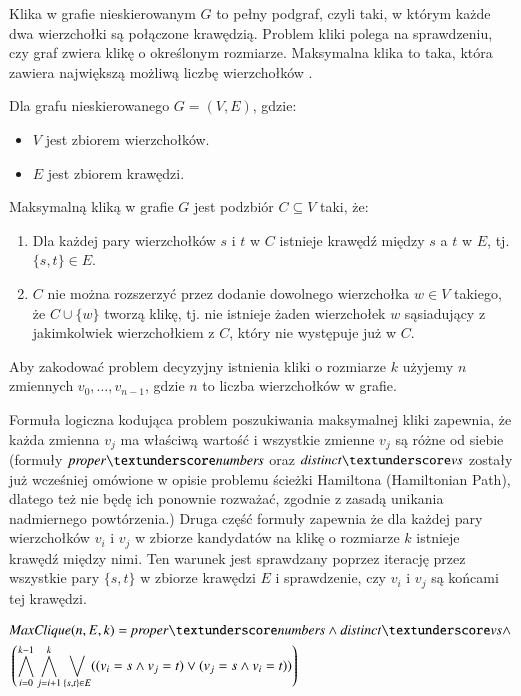 Klika w grafie nieskierowanym \(G\) to pełny podgraf, czyli taki, w którym każde dwa wierzchołki są połączone krawędzią. Problem kliki polega na sprawdzeniu, czy graf zwiera klikę o określonym rozmiarze. Maksymalna klika to taka, która zawiera największą możliwą liczbę wierzchołków \cite{Sipser0086373}. 

Dla grafu nieskierowanego $G = (V, E)$, gdzie:
\begin{itemize}
 	\item \(V\) jest zbiorem wierzchołków.
 	\item \(E\) jest zbiorem krawędzi.
\end{itemize}
Maksymalną kliką w grafie \(G\) jest podzbiór $C \subseteq V$ taki, że:
\begin{enumerate}
 	\item Dla każdej pary wierzchołków \(s\) i \(t\) w \(C\) istnieje krawędź między \(s\) a \(t\) w \(E\), tj. $\{s, t\}\in E$. 
 	\item \(C\) nie można rozszerzyć przez dodanie dowolnego wierzchołka $w\in V$ takiego, że $C \cup \{w\}$ tworzą klikę, tj. nie istnieje żaden wierzchołek \(w\) sąsiadujący z jakimkolwiek wierzchołkiem z \(C\), który nie występuje już w \(C\).
\end{enumerate}

Aby zakodować problem decyzyjny istnienia kliki o rozmiarze $k$ użyjemy $n$ zmiennych $v_0,\ldots,v_{n-1}$, gdzie $n$ to liczba wierzchołków w grafie.

Formuła logiczna kodująca problem poszukiwania maksymalnej kliki zapewnia, że każda zmienna \(v_j\) ma właściwą wartość i wszystkie zmienne \(v_j\) są różne od siebie (formuły $\propernumbers$ oraz $\distinctvs$ zostały już wcześniej omówione w opisie problemu ścieżki Hamiltona (Hamiltonian Path), dlatego też nie będę ich ponownie rozważać, zgodnie z zasadą unikania nadmiernego powtórzenia.) Druga część formuły zapewnia że dla każdej pary wierzchołków \(v_i\) i \(v_j\) w zbiorze kandydatów na klikę o rozmiarze \(k\) istnieje krawędź między nimi. Ten warunek jest sprawdzany poprzez iterację przez wszystkie pary $\{s,t\}$ w zbiorze krawędzi \(E\) i sprawdzenie, czy \(v_i\) i \(v_j\) są końcami tej krawędzi.

\begin{align*}
	&\MaxClique(n, E, k) = \propernumbers  \land \distinctvs  \land \\
	&\left( \bigwedge_{i=0}^{k-1} \bigwedge_{j=i+1}^{k} \bigvee_{\{s,t\} \in E} ((v_i = s \land v_j = t) \lor (v_j = s \land v_i = t)) \right)	
\end{align*}

